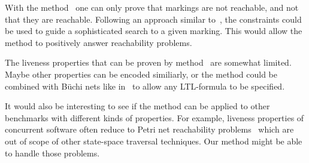 With the method \safety\ one can only prove that markings are not reachable, and not that they
are reachable. Following an approach similar to~\cite{WimmelWolf12}, the
constraints could be used to guide a sophisticated search to a given marking.
This would allow the method to positively answer reachability problems.

The liveness properties that can be proven by method \liveness\ are somewhat limited.
Maybe other properties can be encoded similiarly,
or the method could be combined with Büchi nets like in~\cite{EsparzaMelzer97} to allow
any LTL-formula to be specified. 

It would also be interesting to see if the method can be applied to
other benchmarks with different kinds of properties.
For example, liveness properties of concurrent software
often reduce to Petri net reachability problems~\cite{GantyMajumdar12}
which are out of scope of other state-space traversal techniques.
Our method might be able to handle those problems.

